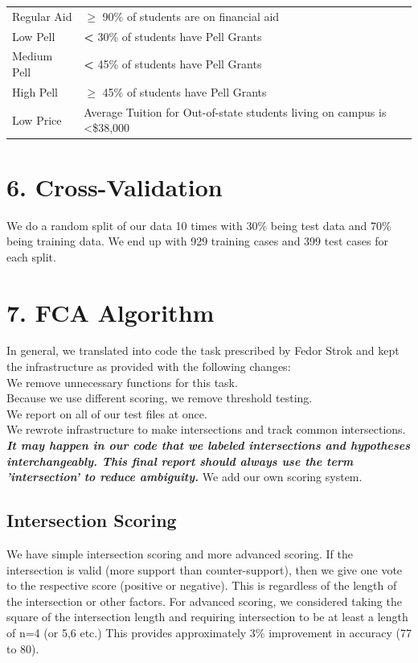 \documentclass[12pt, a4, epsf] {article}
\theoremstyle{plain}
\theoremstyle{definition}
\begin{document}
\begin{table}[htbp]
\begin{tabular}{ll}
Regular Aid               & $\geq$ 90\% of students are on financial aid                              \\
Low Pell                  & \textbf{\textless{} }30\% of students have Pell Grants                                      \\
Medium Pell               & \textbf{\textless{}} 45\% of students have Pell Grants                                      \\
High Pell                 & $\geq$ 45\% of students have Pell Grants                                  \\
Low Price                 & Average Tuition for Out-of-state students living on campus is \textless{}\$38,000
\end{tabular}
\end{table}
\section*{6. Cross-Validation}
We do a random split of our data 10 times with 30\% being test data and 70\% being training data. We end up with 929 training cases and 399 test cases for each split.
\section*{7. FCA Algorithm}
In general, we translated into code the task prescribed by Fedor Strok and kept the infrastructure as provided with the following changes:\\
We remove unnecessary functions for this task.\\
Because we use different scoring, we remove threshold testing.\\
We report on all of our test files at once.\\
We rewrote infrastructure to make intersections and track common intersections.\\
\textbf{\textit{It may happen in our code that we labeled intersections and hypotheses interchangeably. This final report should always use the term 'intersection' to reduce ambiguity.}}
We add our own scoring system.\\
\subsection*{Intersection Scoring}
We have simple intersection scoring and more advanced scoring. If the intersection is valid (more support than counter-support), then we give one vote to the respective score (positive or negative). This is regardless of the length of the intersection or other factors. For advanced scoring, we considered taking the square of the intersection length and requiring intersection to be at least a length of n=4 (or 5,6 etc.) This provides approximately 3\% improvement in accuracy (77 to 80).
\end{document}
